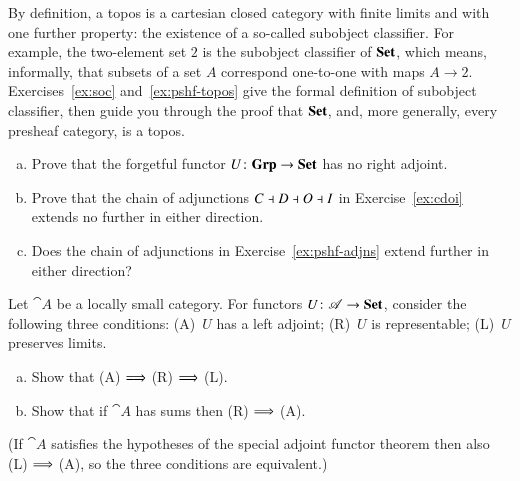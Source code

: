 By definition, a topos is a cartesian closed category with finite limits
and with one further property: the existence of a so-called subobject%
%
%
classifier.  For example, the two-element%
%
%
set $2$ is the subobject classifier of $\mathbf{Set}$, which means, informally,
that subsets of a set $A$ correspond one-to-one with maps $A \to 2$.
Exercises~\ref{ex:soc} and~\ref{ex:pshf-topos} give the formal definition
of subobject classifier, then guide you through the proof that $\mathbf{Set}$, and,
more generally, every presheaf category, is a topos.%
%
%
%


\exs


\begin{question}
\label{ex:no-adjt}
\begin{enumerate}[(b)]
\item
Prove that the forgetful functor $U\from \Grp \to \Set$ has no right
adjoint.

\item
Prove that the chain of adjunctions $C \dashv D \dashv O \dashv I$%
%
%
in Exercise~\ref{ex:cdoi} extends no further in either direction.

\item
Does the chain of adjunctions in Exercise~\ref{ex:pshf-adjns} extend
further in either direction?
\end{enumerate}
\end{question}


\begin{question}
Let $\cat{A}$ be a locally small category.  For functors $U\from \cat{A}
\to \Set$, consider the following three conditions: (A)~$U$ has a left
adjoint; (R)~$U$ is representable; (L)~$U$ preserves limits.
%
\begin{enumerate}[(b)]
\item
Show that (A) $\Longrightarrow$ (R) $\Longrightarrow$ (L).

\item
Show that if $\cat{A}$ has sums then (R) $\Longrightarrow$ (A).%
%
%
\end{enumerate}
%
(If $\cat{A}$ satisfies the hypotheses of the special adjoint functor
theorem then also (L) $\Longrightarrow$ (A), so the three conditions are
equivalent.)
\end{question}


